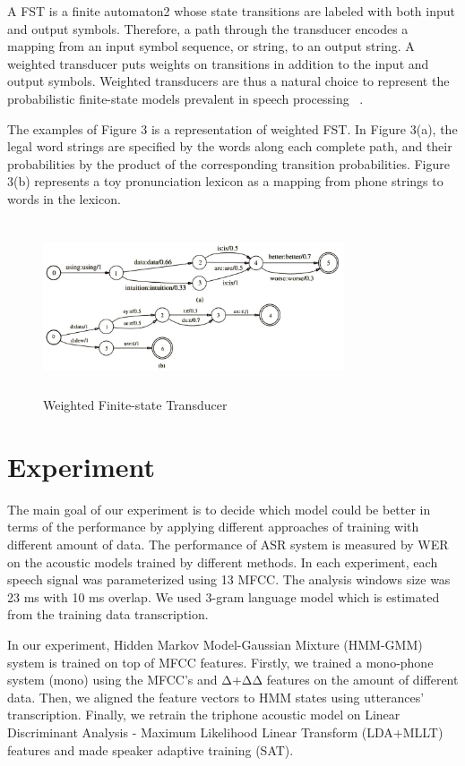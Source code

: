 \documentclass[conference]{IEEEtran}
\begin{document}
A FST is a finite automaton2 whose state transitions are labeled with both input and output symbols. Therefore, a path through the transducer encodes a mapping from an input symbol sequence, or string, to an output string. A weighted transducer puts weights on transitions in addition to the input and output symbols. Weighted transducers are thus a natural choice to represent the probabilistic finite-state models prevalent in speech processing ~\cite{wfst}.

The examples of Figure 3 is a representation of weighted FST. In Figure 3(a), the legal word strings are specified by the words along each complete path, and their probabilities by the product of the corresponding transition probabilities. Figure 3(b) represents a toy pronunciation lexicon as a mapping from phone strings to words in the lexicon.
\begin{figure}[htbp]
\centerline{\includegraphics[width=3.5in, height=2in]{Fig3.jpg}}
\caption{Weighted Finite-state Transducer}
\label{fig:fstpic}
\end{figure}

\section{Experiment}
\label{sec:Experiment}
The main goal of our experiment is to decide which model could be better in terms of the performance by applying different approaches of training with different amount of data. The performance of ASR system is measured by WER on the acoustic models trained by different methods. In each experiment, each speech signal was parameterized using 13 MFCC. The analysis windows size was 23 ms with 10 ms overlap. We used 3-gram language model which is estimated from the training data transcription.

In our experiment, Hidden Markov Model-Gaussian Mixture (HMM-GMM) system is trained on top of MFCC features. Firstly, we trained a mono-phone system (mono) using the MFCC’s and Δ+ΔΔ features on the amount of different data. Then, we aligned the feature vectors to HMM states using utterances’ transcription. Finally, we retrain the triphone acoustic model on Linear Discriminant Analysis - Maximum Likelihood Linear Transform (LDA+MLLT) features and made speaker adaptive training (SAT). 
\end{document}
